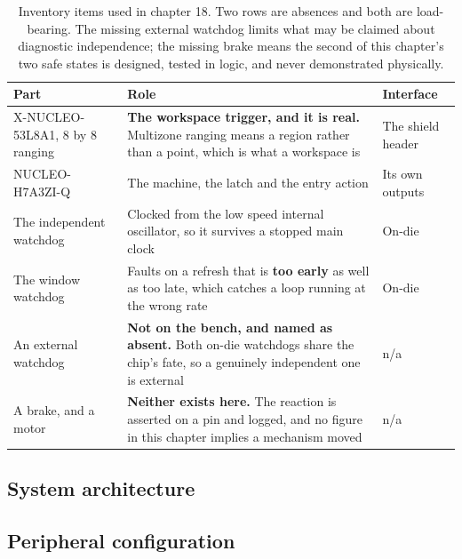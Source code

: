 \begin{table}[H]\centering\small
\begin{tabular}{p{40mm}p{66mm}p{40mm}}
\toprule
Part & Role & Interface \\
\midrule
X-NUCLEO-53L8A1, 8 by 8 ranging & \textbf{The workspace trigger, and it is
real.} Multizone ranging means a region rather than a point, which is what a
workspace is & The shield header \\
NUCLEO-H7A3ZI-Q & The machine, the latch and the entry action & Its own outputs \\
The independent watchdog & Clocked from the low speed internal oscillator, so it
survives a stopped main clock & On-die \\
The window watchdog & Faults on a refresh that is \textbf{too early} as well as
too late, which catches a loop running at the wrong rate & On-die \\
An external watchdog & \textbf{Not on the bench, and named as absent.} Both
on-die watchdogs share the chip's fate, so a genuinely independent one is
external & n/a \\
A brake, and a motor & \textbf{Neither exists here.} The reaction is asserted on
a pin and logged, and no figure in this chapter implies a mechanism moved & n/a \\
\bottomrule
\end{tabular}
\caption{Inventory items used in chapter 18. Two rows are absences and both are load-bearing. The missing external watchdog limits what may be claimed about diagnostic independence; the missing brake means the second of this chapter's two safe states is designed, tested in logic, and never demonstrated physically.}
\end{table}

\subsection*{System architecture}


\subsection*{Peripheral configuration}

